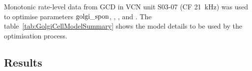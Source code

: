  Monotonic rate-level data from GCD in VCN \citep{GhoshalKim:1996} unit S03-07
 (CF 21~kHz) was used to optimise parameters ${\rm golgi\_spon}$, \wLSRGLG,
 \wHSRGLG, and \sANFGLG\@.  The table~\ref{tab:GolgiCellModelSummary} shows the
 model details to be used by the optimisation process.

 








 \subsection{Results}

